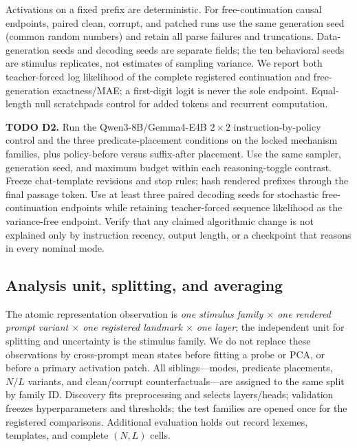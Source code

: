 \documentclass[10pt,twocolumn]{article}
\newcommand{\todoid}[2]{%
  \par\noindent\textcolor{red!75!black}{\textbf{TODO #1.} #2}\par}
\begin{document}
Activations on a fixed prefix are deterministic. For free-continuation causal endpoints, paired
clean, corrupt, and patched runs use the same generation seed (common random numbers) and retain
all parse failures and truncations. Data-generation seeds and decoding seeds are separate fields;
the ten behavioral seeds are stimulus replicates, not estimates of sampling variance. We report
both teacher-forced log likelihood of the complete registered continuation and free-generation
exactness/MAE; a first-digit logit is never the sole endpoint. Equal-length null scratchpads
control for added tokens and recurrent computation.

\todoid{D2}{Run the Qwen3-8B/Gemma4-E4B $2\times2$ instruction-by-policy control and the three
predicate-placement conditions on the locked mechanism families, plus policy-before versus
suffix-after placement. Use the same sampler, generation seed, and maximum budget within each
reasoning-toggle contrast. Freeze chat-template revisions and stop rules; hash rendered prefixes
  through the final passage token. Use at least three paired decoding seeds for stochastic
  free-continuation endpoints while retaining teacher-forced sequence likelihood as the
  variance-free endpoint. Verify that any claimed algorithmic change is not explained only by
  instruction recency, output length, or a checkpoint that reasons in every nominal mode.}

\subsection{Analysis unit, splitting, and averaging}
The atomic representation observation is
\emph{one stimulus family $\times$ one rendered prompt variant $\times$ one registered
landmark $\times$ one layer}; the independent unit for splitting and uncertainty is the
stimulus family. We do not replace these observations by cross-prompt mean states before
fitting a probe or PCA, or before a primary activation patch. All siblings---modes,
predicate placements, $N/L$ variants, and clean/corrupt
counterfactuals---are assigned to the same split by family ID. Discovery fits preprocessing and
selects layers/heads; validation freezes hyperparameters and thresholds; the test families are
opened once for the registered comparisons. Additional evaluation holds out record lexemes,
templates, and complete $(N,L)$ cells.
\end{document}

